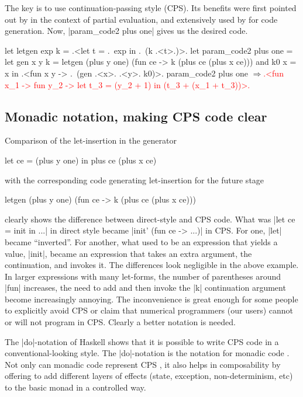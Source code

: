 \documentclass[draft]{elsart}
\newcommand{\evalresult}[1]{\ensuremath{\Longrightarrow}\textcolor{red}{#1}}
\begin{document}
The key is to use continuation-passing style (CPS). Its benefits were
first pointed out by \cite{Bondorf:92} in the context of partial
evaluation, and extensively used by \cite{MSP:PADL04,KiselyovTaha} for
code generation. Now, |param_code2 plus one| gives us the desired
code.

\begin{code}
let letgen exp k = .<let t = .~exp in .~(k .<t>.)>.
let param_code2 plus one =
  let gen x y k = letgen (plus y one)
                         (fun ce -> k (plus ce (plus x ce)))
  and k0 x = x
  in .<fun x y -> .~(gen .<x>. .<y>. k0)>.
param_code2 plus one
\evalresult{.<fun x_1 -> fun y_2 -> let t_3 = (y_2 + 1) in (t_3 + (x_1 + t_3))>.}
\end{code}

\subsection{Monadic notation, making CPS code clear}\label{monadicnotation}

Comparison of the let-insertion in the generator
\begin{code}
let ce = (plus y one) in  plus ce (plus x ce)
\end{code}
with the corresponding code generating let-insertion for the future
stage
\begin{code}
letgen (plus y one) (fun ce -> k (plus ce (plus x ce)))
\end{code}
clearly shows the difference between  direct-style and CPS code.
What was |let ce = init in ...| in direct style became
|init' (fun ce -> ...)| in CPS. For one, |let| became
``inverted''. For another, what used to be an expression that yields
a value, |init|, became an expression that takes an extra argument,
the continuation, and invokes it. The differences look negligible in
the above example. In larger expressions with many let-forms, the
number of parentheses around |fun| increases, the need to add and
then invoke the |k| continuation argument become increasingly annoying. The
inconvenience is great enough for some people to explicitly avoid CPS
or claim that numerical programmers (our users) cannot or will not
program in CPS. Clearly a better notation is needed.

The |do|-notation of Haskell \cite{Haskell98Report} shows that it is possible
to write CPS code in a conventional-looking style. The
|do|-notation is the notation for monadic code \cite{moggi-notions}.
Not only can monadic code represent CPS \cite{Filinski:Representing},
it also helps in composability by offering to add different
layers of effects (state, exception, non-determinism, etc) to the
basic monad \cite{liang-interpreter} in a controlled way.
\end{document}
